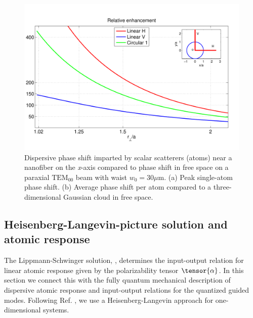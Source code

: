 \documentclass[preprint, aps,pra,onecolumn]{revtex4-1} %
\begin{document}
\begin{figure}
\includegraphics[scale=0.35]{./Figs/RelEnhanceFactor_r_w10micro}
\caption{Dispersive phase shift imparted by scalar scatterers (atoms) near a nanofiber on the \emph{x}-axis compared to phase shift in free space on a paraxial $\mathrm{TEM}_{00}$ beam with waist $w_0 = 30 \mu$m. (a) Peak single-atom phase shift. (b) Average phase shift per atom compared to a three-dimensional Gaussian cloud in free space. }\label{Fig::PhaseShift}
\end{figure}

	
	\subsection{Heisenberg-Langevin-picture solution and atomic response}
	
The Lippmann-Schwinger solution, , determines the input-output relation for linear atomic response given by the polarizability tensor $\tensor{\alpha}$.  
In this section we connect this with the fully quantum mechanical description of dispersive atomic response and input-output relations for the quantized guided modes.  
Following Ref. \cite{le_kien_spontaneous_2005}, we use a Heisenberg-Langevin approach for one-dimensional systems.  
\end{document}
